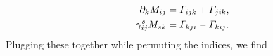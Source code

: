 \begin{subequations}
\begin{align}
 \label{eq:ConnCoeffSymOne}
 \partial_{k} M_{ij}
 &= \varGamma_{ijk} + \varGamma_{jik},
\\ 
 \label{eq:ConnCoeffSymTwo}
 \gamma^{s}_{ij} M_{sk}
 &= \varGamma_{kji} - \varGamma_{kij}.
\end{align} 
\end{subequations}
Plugging these together while permuting the indices, we find
